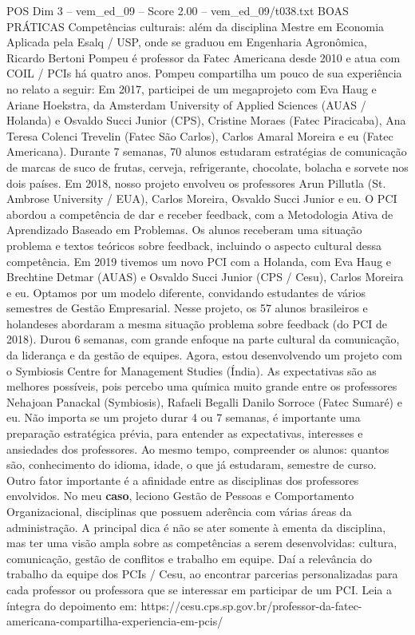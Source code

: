 \begin{textsample}{POS Dim 3 – vem\_ed\_09 – Score 2.00 – vem\_ed\_09/t038.txt}  \label{ex:f3_pos_184}
BOAS PRÁTICAS Competências culturais: além da disciplina Mestre em Economia Aplicada pela Esalq / USP, onde se graduou em Engenharia Agronômica, Ricardo Bertoni Pompeu é professor da Fatec Americana desde 2010 e atua com COIL / PCIs há quatro anos.
Pompeu compartilha um pouco de sua experiência no relato a seguir: Em 2017, participei de um megaprojeto com Eva Haug e Ariane Hoekstra, da Amsterdam University of Applied Sciences (AUAS / Holanda) e Osvaldo Succi Junior (CPS), Cristine Moraes (Fatec Piracicaba), Ana Teresa Colenci Trevelin (Fatec São Carlos), Carlos Amaral Moreira e eu (Fatec Americana).
Durante 7 semanas, 70 alunos estudaram estratégias de comunicação de marcas de suco de frutas, cerveja, refrigerante, chocolate, bolacha e sorvete nos dois países.
Em 2018, nosso projeto envolveu os professores Arun Pillutla (St.
Ambrose University / EUA), Carlos Moreira, Osvaldo Succi Junior e eu.
O PCI abordou a competência de dar e receber feedback, com a Metodologia Ativa de Aprendizado Baseado em Problemas.
Os alunos receberam uma situação problema e textos teóricos sobre feedback, incluindo o aspecto cultural dessa competência.
Em 2019 tivemos um novo PCI com a Holanda, com Eva Haug e Brechtine Detmar (AUAS) e Osvaldo Succi Junior (CPS / Cesu), Carlos Moreira e eu.
Optamos por um modelo diferente, convidando estudantes de vários semestres de Gestão Empresarial.
Nesse projeto, os 57 alunos brasileiros e holandeses abordaram a mesma situação problema sobre feedback (do PCI de 2018).
Durou 6 semanas, com grande enfoque na parte cultural da comunicação, da liderança e da gestão de equipes.
Agora, estou desenvolvendo um projeto com o Symbiosis Centre for Management Studies (Índia).
As expectativas são as melhores possíveis, pois percebo uma química muito grande entre os professores Nehajoan Panackal (Symbiosis), Rafaeli Begalli Danilo Sorroce (Fatec Sumaré) e eu.
Não importa se um projeto durar 4 ou 7 semanas, é importante uma preparação estratégica prévia, para entender as expectativas, interesses e ansiedades dos professores.
Ao mesmo tempo, compreender os alunos: quantos são, conhecimento do idioma, idade, o que já estudaram, semestre de curso.
Outro fator importante é a afinidade entre as disciplinas dos professores envolvidos.
No meu \textbf{caso}, leciono Gestão de Pessoas e Comportamento Organizacional, disciplinas que possuem aderência com várias áreas da administração.
A principal dica é não se ater somente à ementa da disciplina, mas ter uma visão ampla sobre as competências a serem desenvolvidas: cultura, comunicação, gestão de conflitos e trabalho em equipe.
Daí a relevância do trabalho da equipe dos PCIs / Cesu, ao encontrar parcerias personalizadas para cada professor ou professora que se interessar em participar de um PCI.
Leia a íntegra do depoimento em: https://cesu.cps.sp.gov.br/professor-da-fatec-americana-compartilha-experiencia-em-pcis/

\end{textsample}
